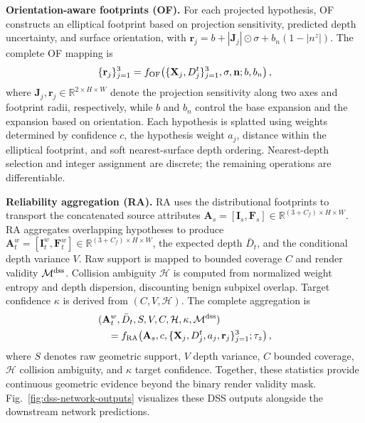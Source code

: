 \documentclass[letterpaper,10pt,conference]{ieeeconf}
\newcommand{\R}{\mathbb{R}}
\newcommand{\I}{\mathbf{I}}
\newcommand{\M}{\mathcal{M}}
\newcommand{\F}{\mathbf{F}}
\newcommand{\n}{\mathbf{n}}
\begin{document}
\textbf{Orientation-aware footprints (OF).}
For each projected hypothesis, OF constructs an elliptical footprint based on
projection sensitivity, predicted depth uncertainty, and surface orientation,
with $\mathbf r_j=b+|\mathbf J_j|\odot\sigma+b_n(1-|n^z|)$.
The complete OF mapping is
\begin{equation}
 \{\mathbf r_j\}_{j=1}^{3}=f_{\rm OF}\!\left(
 \{\mathbf X_j,D_j^t\}_{j=1}^{3},\sigma,\n;b,b_n\right),
\label{eq:of-function}
\end{equation}
where $\mathbf J_j,\mathbf r_j\in\R^{2\times H\times W}$ denote the projection
sensitivity along two axes and footprint radii, respectively, while $b$ and
$b_n$ control the base expansion and the expansion based on orientation. Each hypothesis is
splatted using weights determined by confidence $c$, the hypothesis weight
$a_j$, distance within the elliptical footprint, and soft nearest-surface depth
ordering. Nearest-depth
selection and integer assignment are discrete; the remaining operations are
differentiable.

\textbf{Reliability aggregation (RA).}
RA uses the distributional footprints to transport the concatenated source
attributes $\mathbf A_s=[\I_s,\F_s]\in\R^{(3+C_f)\times H\times W}$. RA
aggregates overlapping hypotheses to produce
$\mathbf A_t^w=[\I_t^w,\F_t^w]\in\R^{(3+C_f)\times H\times W}$, the expected
depth $\bar D_t$, and the conditional depth variance $V$. Raw support is mapped
to bounded coverage $C$ and render validity $\M^{\rm dss}$. Collision ambiguity
$\mathcal H$ is computed from normalized weight entropy and depth dispersion,
discounting benign subpixel overlap. Target confidence $\kappa$ is
derived from $(C,V,\mathcal H)$. The complete aggregation is
\begin{equation}
\begin{aligned}
&(\mathbf A_t^w,\bar D_t,S,V,C,\mathcal H,\kappa,\M^{\rm dss})\\
&\quad=f_{\rm RA}\!\left(
\mathbf A_s,c,\{\mathbf X_j,D_j^t,a_j,\mathbf r_j\}_{j=1}^{3};\tau_z
\right),
\end{aligned}
\label{eq:ra-function}
\end{equation}
where $S$ denotes raw geometric support, $V$ depth variance, $C$ bounded
coverage, $\mathcal H$ collision ambiguity, and $\kappa$ target confidence.
Together, these statistics provide continuous geometric evidence beyond the
binary render validity mask. Fig.~\ref{fig:dss-network-outputs} visualizes these
DSS outputs alongside the downstream network predictions.
\end{document}
